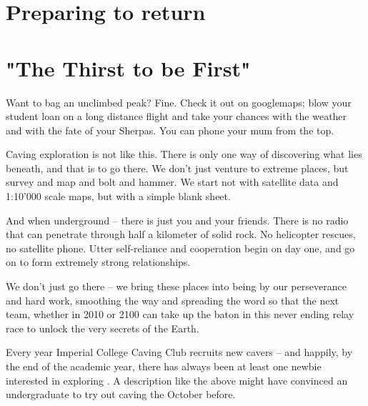 \section{Preparing to return}

\section{"The Thirst to be First"}

Want to bag an unclimbed peak? Fine. Check it out on googlemaps; blow your student loan on a long distance flight and take your chances with the weather and with the fate of your Sherpas. You can phone your mum from the top.




Caving exploration is not like this. There is only one way of discovering what lies beneath, and that is to go there. We don't just venture to extreme places, but survey and map and bolt and hammer. We start not with satellite data and 1:10'000 scale maps, but with a simple blank sheet.

And when underground -- there is just you and your friends. There is no radio that can penetrate through half a kilometer of solid rock. No helicopter rescues, no satellite phone. Utter self-reliance and cooperation begin on day one, and go on to form extremely strong relationships.

We don't just go there -- we bring these places into being by our perseverance and hard work, smoothing the way and spreading the word so that the next team, whether in 2010 or 2100 can take up the baton in this never ending relay race to unlock the very secrets of the Earth.




Every year Imperial College Caving Club recruits new cavers -- and happily, by the end of the academic year, there has always been at least one newbie interested in exploring . A description like the above might have convinced an undergraduate to try out caving the October before.

